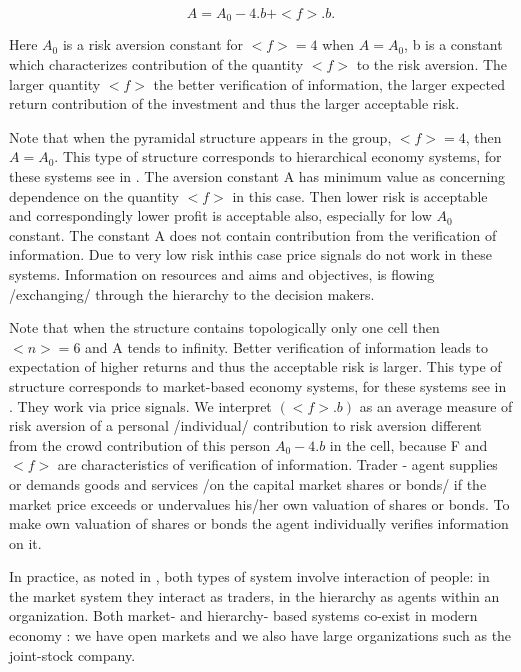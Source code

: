 \documentclass[10pt]{article}
\begin{document}
\begin{equation}
\label{1}
A = A_{0} - 4.b + <f>.b .
\end{equation}

Here $ A_{0}$ is a risk aversion constant for $<f> = 4$ when $A = A_{0} $, b is a constant which characterizes contribution
of the quantity $<f>$ to the risk aversion. The larger quantity $<f>$ the better verification of information, the larger expected return contribution of the investment and thus the larger acceptable risk.


Note that when the pyramidal structure appears in the group, $<f> = 4$, then $A = A_{0} $.
This type of structure  corresponds to hierarchical economy systems, for these systems see in \cite{6}. The aversion constant A has minimum value as concerning dependence on the quantity $ <f> $ in this case. Then lower risk is acceptable and correspondingly lower profit is acceptable also, especially for low $ A_{0} $ constant. The constant A does not contain contribution from the verification of information. Due to very low risk inthis case price signals do not work in these systems. Information on resources and aims and objectives, is flowing /exchanging/ through the hierarchy to the decision makers.


Note that when the structure
contains topologically only one cell then $<n> = 6$ and A tends to infinity. Better verification of information leads to expectation of higher returns and thus the acceptable risk is larger.
This type of structure  corresponds to market-based economy systems, for these systems see in \cite{6}. They work via price signals.
We interpret $(<f>.b)$ as an average measure of risk aversion of a personal /individual/ contribution to risk aversion different from the crowd contribution of this person $ A_{0} - 4.b $ in the cell, because F and $<f>$ are characteristics of verification of information. Trader - agent supplies or demands goods and services /on the capital market shares or bonds/ if the market price exceeds or undervalues his/her own valuation of shares or bonds. To make own valuation of shares or bonds the agent individually verifies information on it.


In practice, as noted in \cite{6}, both types of system involve interaction of people: in the market system they interact  as traders, in the hierarchy as agents within an organization. Both market- and hierarchy- based systems co-exist in modern economy \cite{6}: we have open markets and we also have large organizations such as the joint-stock company.
\end{document}
